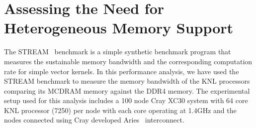 \section{Assessing the Need for Heterogeneous Memory Support}
\label{src:drelated}

The STREAM~\cite{stream} benchmark is a simple synthetic benchmark
program that measures the sustainable memory bandwidth and the
corresponding computation rate for simple vector kernels. In this
performance analysis, we have used the STREAM benchmark to measure
the memory bandwidth of the KNL processors comparing its MCDRAM memory
against the DDR4 memory. The experimental setup used for this analysis
includes a 100 node Cray XC30 system with 64 core KNL processor (7250)
per node with each core operating at 1.4GHz and the nodes connected
using Cray developed Aries~\cite{aries} interconnect.
